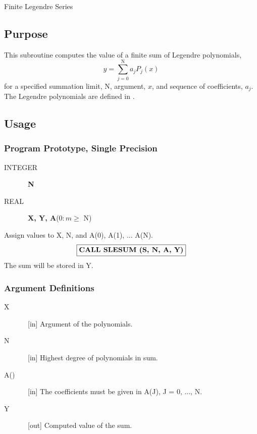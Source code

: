 \documentclass[twoside]{MATH77}
\begin{document}
 Finite Legendre Series


\subsection{Purpose}

This subroutine computes the value of a finite sum of Legendre polynomials,
\begin{equation*}
y=\sum_{j=0}^{\text{N}}a_jP_j(x)
\end{equation*}
for a specified summation limit, N, argument, $x$, and sequence of
coefficients, $a_j$. The Legendre polynomials are defined in \cite{ams55:or-poly}.

\subsection{Usage}

\subsubsection{Program Prototype, Single Precision}

\begin{description}
\item[INTEGER]  \ {\bf N}

\item[REAL]  \ {\bf X, Y, A}($0:m\geq $ N)
\end{description}

Assign values to X, N, and A(0), A(1), ... A(N).
$$
\fbox{{\bf CALL SLESUM (S, N, A, Y)}}
$$
The sum will be stored in Y.

\subsubsection{Argument Definitions}

\begin{description}
\item[X]  \ [in] Argument of the polynomials.

\item[N]  \ [in] Highest degree of polynomials in sum.

\item[A()]  \ [in] The coefficients must be given in A(J), J = 0, ..., N.

\item[Y]  \ [out] Computed value of the sum.
\end{description}
\end{document}
